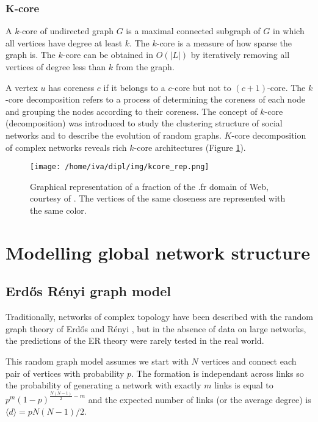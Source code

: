 \documentclass[times, utf8, diplomski]{fer}
\begin{document}
\subsubsection{K-core}
A $k$-core of undirected graph $G$ is a maximal connected subgraph of $G$ in which all vertices have degree at least $k$. The $k$-core is a measure of how sparse the graph is. The $k$-core can be obtained in $O(|L|)$ by iteratively removing all vertices of degree less than $k$ from the graph. 

 A vertex $u$ has coreness $c$ if it belongs to a $c$-core but not to  $(c+1)$-core. The $k$-core decomposition refers to a process of determining the coreness of each node and grouping the nodes according to their coreness. The concept of $k$-core (decomposition) was introduced to study the clustering structure of social networks and to describe the evolution of random graphs. $K$-core decomposition of complex networks reveals rich $k$-core architectures (Figure \ref{kcore}). 

\begin{figure}
\texttt{[image: /home/iva/dipl/img/kcore\_rep.png]}
\caption{Graphical representation of a fraction of the .fr domain of Web, courtesy of \citet{Alvarez-hamelin_k-coredecomposition:}. The vertices of the same closeness are represented with the same color.}
\label{kcore}
\end{figure}

\section{Modelling global network structure}
\subsection{Erd{\H{o}}s R{\'{e}}nyi graph model}

Traditionally, networks of complex topology have been described with the random graph theory of Erd{\H{o}}s and R{\'{e}}nyi \cite{Erdos1959}, but in the absence of data on large networks, the predictions of the ER theory were rarely tested in the real world.

This random graph model assumes we start with $N$ vertices and connect each pair of vertices with probability $p$. The formation is independant across links so the probability of generating a network with exactly $m$ links is equal to $p^m(1 - p)^{\frac{N(N - 1)}{2} - m}$ and the expected number of links (or the average degree) is $\langle d \rangle = pN(N - 1) / 2$. 
\end{document}
